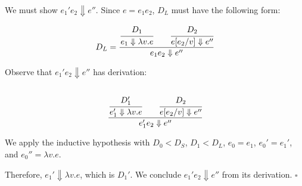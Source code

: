 \documentclass{article}
\begin{document}
\begin{enumerate}
\begin{enumerate}
        We must show \(e_1' e_2 \Downarrow e''\).
        Since \(e = e_1 e_2\), \(D_L\) must have the following form:

        \begin{equation}
            D_L = \cfrac{\cfrac{D_1}
                        {e_1 \Downarrow \lambda v.e} \qquad \cfrac{D_2}
                        {e [e_2 / v] \Downarrow e''}}
                    {e_1 e_2 \Downarrow e''} \\
        \end{equation}

        Observe that \(e_1' e_2 \Downarrow e''\) has derivation:
        \\~\\
        \begin{equation}
            \cfrac{\cfrac{D_1'}{e_1' \Downarrow \lambda v.e} \qquad \cfrac{D_2}{e[e_2/v] \Downarrow e''}}
                {e_1' e_2 \Downarrow e''}
        \end{equation}

        We apply the inductive hypothesis with \(D_0 < D_S\), \(D_1 < D_L\), \(e_0 = e_1\),
        \(e_0' = e_1'\), and \(e_0'' = \lambda v.e\).

        Therefore, \(e_1' \Downarrow \lambda v.e\), which is \(D_1'\).
        We conclude \(e_1' e_2 \Downarrow e''\) from its derivation. \(\square\)
    \end{enumerate}
\end{enumerate}
\end{document}
